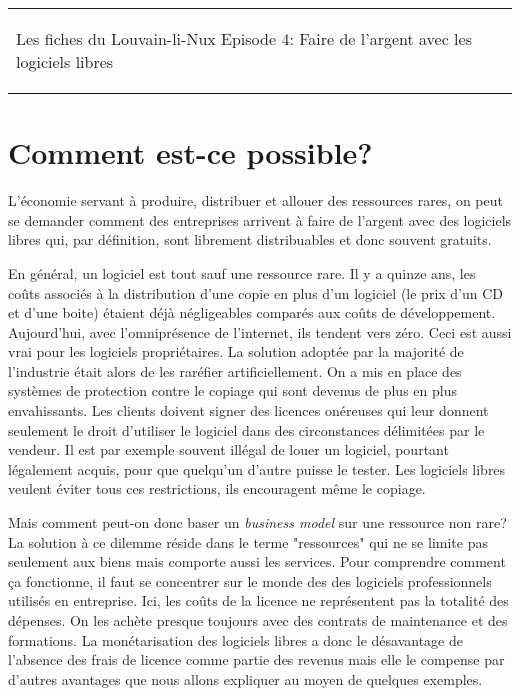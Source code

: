 



\begin{tabular}{p{13cm}r}
    \begin{center}{\Large Les fiches du Louvain-li-Nux\linebreak \linebreak
    \LARGE Episode 4: Faire de l'argent avec les logiciels libres}\end{center}
		&
	\usebox{\logollnux}
\end{tabular}


\section*{Comment est-ce possible?}
L'économie servant à produire, distribuer et allouer des ressources rares,
on peut se demander comment des entreprises arrivent à faire de l'argent avec des logiciels libres qui, par définition, sont librement distribuables et donc souvent gratuits.

En général, un logiciel est tout sauf une ressource rare. Il y a quinze ans, les coûts
associés à la distribution d'une copie en plus d'un logiciel (le prix d'un CD et d'une boite) étaient déjà négligeables
comparés aux coûts de développement. Aujourd’hui, avec l'omniprésence de l'internet, ils tendent vers zéro.
Ceci est aussi vrai pour les logiciels propriétaires. La solution adoptée par
la majorité de l'industrie était alors de les raréfier artificiellement.
On a mis en place des systèmes de protection contre le copiage qui sont devenus 
de plus en plus envahissants. Les clients doivent signer des licences onéreuses qui
leur donnent seulement le droit d'utiliser le logiciel dans des circonstances délimitées par le vendeur.
Il est par exemple souvent illégal de louer un logiciel, pourtant légalement acquis,
pour que quelqu'un d'autre puisse le tester.
Les logiciels libres veulent éviter tous ces restrictions, ils encouragent même le copiage.

Mais comment peut-on donc baser un \textit{business model} sur une ressource non rare?                           
La solution à ce dilemme réside dans le terme "ressources" qui
ne se limite pas seulement aux biens mais comporte aussi les services.
Pour comprendre comment ça fonctionne, il faut se concentrer sur le monde des 
des logiciels professionnels utilisés en entreprise. Ici, les coûts de la licence
ne représentent pas la totalité des dépenses. On les achète presque toujours avec
des contrats de maintenance et des formations.
La monétarisation des logiciels libres a donc le désavantage de l'absence des frais de licence
comme partie des revenus mais elle le compense par d'autres avantages que nous allons 
expliquer au moyen de quelques exemples.

